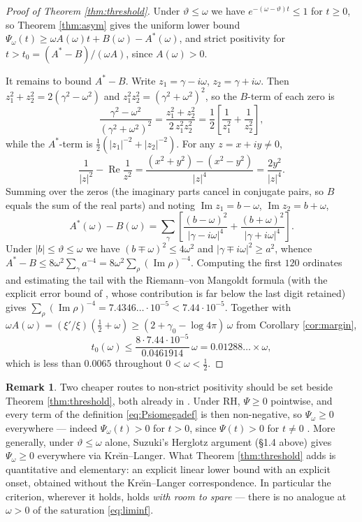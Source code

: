 \documentclass[11pt,reqno]{amsart}
\theoremstyle{plain}
\theoremstyle{definition}
\newtheorem{remark}[theorem]{Remark}
\newcommand{\Rp}{\operatorname{Re}}
\newcommand{\Ip}{\operatorname{Im}}
\begin{document}
\begin{proof}[Proof of Theorem \ref{thm:threshold}]
Under $\vartheta\le\omega$ we have $e^{-(\omega-\vartheta)t}\le1$ for $t\ge0$, so Theorem
\ref{thm:asym} gives the uniform lower bound
$\Psi_\omega(t)\ge\omega A(\omega)t+B(\omega)-A^{*}(\omega)$, and strict positivity for
$t>t_0=(A^{*}-B)/(\omega A)$, since $A(\omega)>0$.

It remains to bound $A^{*}-B$. Write $z_1=\gamma-i\omega$, $z_2=\gamma+i\omega$. Then
$z_1^{2}+z_2^{2}=2(\gamma^{2}-\omega^{2})$ and $z_1^{2}z_2^{2}=(\gamma^{2}+\omega^{2})^{2}$, so the
$B$-term of each zero is
\[
  \frac{\gamma^{2}-\omega^{2}}{(\gamma^{2}+\omega^{2})^{2}}
  =\frac{z_1^{2}+z_2^{2}}{2\,z_1^{2}z_2^{2}}
  =\frac12\left[\frac{1}{z_1^{2}}+\frac{1}{z_2^{2}}\right],
\]
while the $A^{*}$-term is $\tfrac12(|z_1|^{-2}+|z_2|^{-2})$. For any $z=x+iy\neq0$,
\[
  \frac{1}{|z|^{2}}-\Rp\frac{1}{z^{2}}
  =\frac{(x^{2}+y^{2})-(x^{2}-y^{2})}{|z|^{4}}
  =\frac{2y^{2}}{|z|^{4}} .
\]
Summing over the zeros (the imaginary parts cancel in conjugate pairs, so $B$ equals the sum of the
real parts) and noting $\Ip z_1=b-\omega$, $\Ip z_2=b+\omega$,
\begin{equation}\label{eq:AstarminusB}
  A^{*}(\omega)-B(\omega)
  =\sum_\gamma\left[\frac{(b-\omega)^{2}}{|\gamma-i\omega|^{4}}
  +\frac{(b+\omega)^{2}}{|\gamma+i\omega|^{4}}\right].
\end{equation}
Under $|b|\le\vartheta\le\omega$ we have $(b\mp\omega)^{2}\le4\omega^{2}$ and
$|\gamma\mp i\omega|^{2}\ge a^{2}$, whence
$A^{*}-B\le8\omega^{2}\sum_\gamma a^{-4}=8\omega^{2}\sum_\rho(\Ip\rho)^{-4}$. Computing the first
$120$ ordinates and estimating the tail with the Riemann--von Mangoldt formula (with the explicit
error bound of \cite{TrudgianArg}, whose contribution is far below the last digit retained) gives
$\sum_\rho(\Ip\rho)^{-4}=7.4346\ldots\cdot10^{-5}<7.44\cdot10^{-5}$. Together with
$\omega A(\omega)=(\xi'/\xi)(\tfrac12+\omega)\ge(2+\gamma_0-\log4\pi)\,\omega$ from Corollary
\ref{cor:margin},
\[
  t_0(\omega)\le\frac{8\cdot7.44\cdot10^{-5}}{0.0461914}\,\omega=0.01288\ldots\times\omega,
\]
which is less than $0.0065$ throughout $0<\omega<\tfrac12$.
\end{proof}

\begin{remark}\label{rem:trivial}
Two cheaper routes to non-strict positivity should be set beside Theorem \ref{thm:threshold}, both
already in \cite{Suzuki2023}. Under RH, $\Psi\ge0$ pointwise, and every term of the definition
\eqref{eq:Psiomegadef} is then non-negative, so $\Psi_\omega\ge0$ everywhere --- indeed
$\Psi_\omega(t)>0$ for $t>0$, since $\Psi(t)>0$ for $t\neq0$ \cite[Thm.~1.7]{Suzuki2023}. More
generally, under $\vartheta\le\omega$ alone, Suzuki's Herglotz argument (\S1.4 above) gives
$\Psi_\omega\ge0$ everywhere via Kre\u\i n--Langer. What Theorem \ref{thm:threshold} adds is
quantitative and elementary: an explicit linear lower bound with an explicit onset, obtained
without the Kre\u\i n--Langer correspondence. In particular the criterion, wherever it holds, holds
\emph{with room to spare} --- there is no analogue at $\omega>0$ of the saturation
\eqref{eq:liminf}.
\end{remark}
\end{document}
